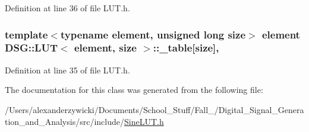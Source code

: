 Definition at line 36 of file L\+U\+T.\+h.

\hypertarget{classDSG_1_1LUT_ac8b23bbb7ce259d4ceb1c6fa93a7f29f}{
\subsubsection[{\+\_\+table}]{\setlength{\rightskip}{0pt plus 5cm}template$<$typename element, unsigned long size$>$ element {\bf D\+S\+G\+::\+L\+U\+T}$<$ element, size $>$\+::\+\_\+table\mbox{[}size\mbox{]}\hspace{0.3cm}{\ttfamily [protected]}, {\ttfamily [inherited]}}}\label{classDSG_1_1LUT_ac8b23bbb7ce259d4ceb1c6fa93a7f29f}


Definition at line 35 of file L\+U\+T.\+h.



The documentation for this class was generated from the following file\+:\begin{DoxyCompactItemize}
\item 
/\+Users/alexanderzywicki/\+Documents/\+School\+\_\+\+Stuff/\+Fall\+\_/\+Digital\+\_\+\+Signal\+\_\+\+Generation\+\_\+and\+\_\+\+Analysis/src/include/\hyperlink{SineLUT_8h}{Sine\+L\+U\+T.\+h}\end{DoxyCompactItemize}
